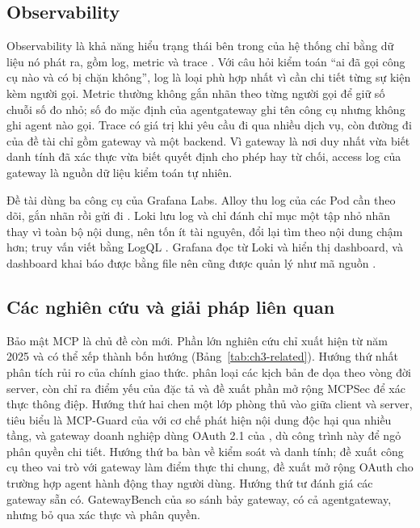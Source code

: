 \subsection{Observability}\label{sec:ch3-obs}

Observability là khả năng hiểu trạng thái bên trong của hệ thống chỉ bằng dữ liệu nó phát ra, gồm log, metric và trace \parencite{majors2022observability}. Với câu hỏi kiểm toán ``ai đã gọi công cụ nào và có bị chặn không'', log là loại phù hợp nhất vì cần chi tiết từng sự kiện kèm người gọi. Metric thường không gắn nhãn theo từng người gọi để giữ số chuỗi số đo nhỏ; số đo mặc định của agentgateway ghi tên công cụ nhưng không ghi agent nào gọi. Trace có giá trị khi yêu cầu đi qua nhiều dịch vụ, còn đường đi của đề tài chỉ gồm gateway và một backend. Vì gateway là nơi duy nhất vừa biết danh tính đã xác thực vừa biết quyết định cho phép hay từ chối, access log của gateway là nguồn dữ liệu kiểm toán tự nhiên.

Đề tài dùng ba công cụ của Grafana Labs. Alloy thu log của các Pod cần theo dõi, gắn nhãn rồi gửi đi \parencite{alloy_docs}. Loki lưu log và chỉ đánh chỉ mục một tập nhỏ nhãn thay vì toàn bộ nội dung, nên tốn ít tài nguyên, đổi lại tìm theo nội dung chậm hơn; truy vấn viết bằng LogQL \parencite{loki_docs}. Grafana đọc từ Loki và hiển thị dashboard, và dashboard khai báo được bằng file nên cũng được quản lý như mã nguồn \parencite{grafana_docs}.

\subsection{Các nghiên cứu và giải pháp liên quan}

Bảo mật MCP là chủ đề còn mới. Phần lớn nghiên cứu chỉ xuất hiện từ năm 2025 và có thể xếp thành bốn hướng (Bảng~\ref{tab:ch3-related}). Hướng thứ nhất phân tích rủi ro của chính giao thức. \textcite{hou2025mcp} phân loại các kịch bản đe dọa theo vòng đời server, còn \textcite{breakingmcp} chỉ ra điểm yếu của đặc tả và đề xuất phần mở rộng MCPSec để xác thực thông điệp. Hướng thứ hai chen một lớp phòng thủ vào giữa client và server, tiêu biểu là MCP-Guard của \textcite{mcpguard} với cơ chế phát hiện nội dung độc hại qua nhiều tầng, và gateway doanh nghiệp dùng OAuth 2.1 của \textcite{securemcpgw}, dù công trình này để ngỏ phân quyền chi tiết. Hướng thứ ba bàn về kiểm soát và danh tính; \textcite{securingmcp} đề xuất công cụ theo vai trò với gateway làm điểm thực thi chung, \textcite{south2025delegation} đề xuất mở rộng OAuth cho trường hợp agent hành động thay người dùng. Hướng thứ tư đánh giá các gateway sẵn có. GatewayBench của \textcite{gatewaybench} so sánh bảy gateway, có cả agentgateway, nhưng bỏ qua xác thực và phân quyền.

